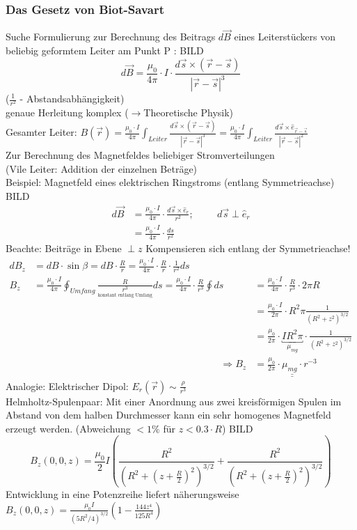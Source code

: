 \subsubsection{Das Gesetz von Biot-Savart}
Suche Formulierung zur Berechnung des Beitrags $ d\vec{B} $ eines Leiterstückers von beliebig geformtem Leiter am Punkt P :
BILD
$$ \boxed{d\vec{B} = \frac{\mu_0}{4\pi} \cdot I \cdot \frac{d\vec{s} \times (\vec{r}-\vec{s})}{|\vec{r}-\vec{s}|^3} } $$
($ \frac{1}{r^2} $ - Abstandsabhängigkeit)\\
genaue Herleitung komplex ($ \rightarrow $Theoretische Physik)\\
Gesamter Leiter: $ B(\vec{r}) = \frac{\mu_0 \cdot I}{4\pi} {\displaystyle\int_{Leiter}} \frac{d\vec{s} \times (\vec{r}-\vec{s})}{|\vec{r}-\vec{s}|^3} = \frac{\mu_0 \cdot I}{4\pi} {\displaystyle\int_{Leiter}} \frac{d\vec{s} \times \hat{e}_{\vec{r}-\vec{s}}}{|\vec{r}-\vec{s}|^2} $ \\
Zur Berechnung des Magnetfeldes beliebiger Stromverteilungen\\
(Vile Leiter: Addition der einzelnen Beträge)\\ \break
Beispiel: Magnetfeld eines elektrischen Ringstroms (entlang Symmetrieachse)
BILD
\begin{align*}
	d\vec{B} &= \frac{\mu_0 \cdot I}{4\pi} \cdot \frac{d\vec{s} \times \hat{e}_r}{r^2} ;\hspace{1cm} d\vec{s} \perp \hat{e}_r\\
	&=\frac{\mu_0 \cdot I}{4\pi} \cdot \frac{ds}{r^2}
\end{align*}
Beachte: Beiträge in Ebene $ \perp z$ Kompensieren sich entlang der Symmetrieachse!
\begin{align*}
 dB_z &= dB\cdot \sin\beta = dB \cdot \frac{R}{r} = \frac{\mu_0 \cdot I}{4\pi} \cdot \frac{R}{r} \cdot \frac{1}{r^2} ds\\
 B_z &= \frac{\mu_0 \cdot I}{4\pi} {\displaystyle\oint_{Umfang}} \frac{R}{\underset{\text{konstant entlang Umfang}}{r^3}} ds = \frac{\mu_0 \cdot I}{4\pi} \cdot \frac{R}{r^3} {\displaystyle\oint}ds &&= \frac{\mu_0 \cdot I}{4\pi} \cdot \frac{R}{r^3} \cdot 2\pi R\\
 & &&=\frac{\mu_0 \cdot I}{2\pi} \cdot R^2\pi\frac{1}{(R^2+z^2)^{3/2}}\\
 & &&= \frac{\mu_0}{2\pi} \cdot \underbracket{\boxed{IR^2\pi}}_{\mu_{mg}} \cdot \frac{1}{(R^2+z^2)^{3/2}}\\
  && \Rightarrow B_z &=\underline{\underline{ \frac{\mu_0}{2\pi} \cdot \mu_{mg} \cdot r^{-3}}}
\end{align*}
Analogie: Elektrischer Dipol: $ E_r(\vec{r}) \sim \frac{\rho}{r^3} $\\
Helmholtz-Spulenpaar:
Mit einer Anordnung aus zwei kreisförmigen Spulen im Abstand von dem halben Durchmesser kann ein sehr homogenes Magnetfeld erzeugt werden. (Abweichung $ <1\% $ für $ z<0.3\cdot R $) BILD
$$ B_z (0,0,z) = \frac{\mu_0}{2}I\left( \frac{R^2}{(R^2+(z+\frac{R}{2})^2 )^{3/2} }+\frac{R^2}{(R^2+(z+\frac{R}{2})^2 )^{3/2} }\right)  $$
Entwicklung in eine Potenzreihe liefert näherungsweise $  B_z (0,0,z) = \frac{\mu_0 I}{(5R^2/4)^{3/2}}\left( 1-\frac{144z^4}{125R^4} \right)  $
